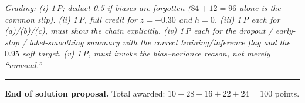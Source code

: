 \documentclass[11pt,a4paper]{article}
\begin{document}
\noindent\emph{Grading: (i) 1\,P; deduct 0.5 if biases are forgotten ($84 + 12 = 96$ alone is the
common slip). (ii) 1\,P, full credit for $z = -0.30$ and $h = 0$. (iii) 1\,P each for (a)/(b)/(c),
must show the chain explicitly. (iv) 1\,P each for the dropout / early-stop / label-smoothing
summary with the correct training/inference flag and the $0.95$ soft target. (v) 1\,P, must invoke
the bias--variance reason, not merely ``unusual.''}

\vspace{1em}
\hrule
\vspace{0.5em}

\noindent\textbf{End of solution proposal.}\quad
Total awarded: $10 + 28 + 16 + 22 + 24 = 100$ points.
\end{document}
